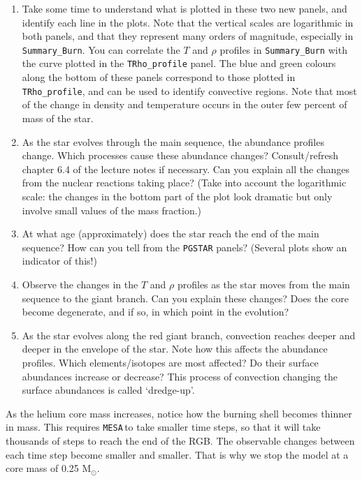 \documentclass[11pt,a4paper]{article}
\newcommand{\MESA}{\texttt{MESA}\,}
\begin{document}
\begin{enumerate}
\begin{enumerate}
\item Take some time to understand what is plotted in these two new panels, and identify each line in the plots. Note that the vertical scales are logarithmic in both panels, and that they represent many orders of magnitude, especially in \verb|Summary_Burn|. You can correlate the $T$ and $\rho$ profiles in \verb|Summary_Burn| with the curve plotted in the \verb|TRho_profile| panel.  The blue and green colours along the bottom of these panels correspond to those plotted in \verb|TRho_profile|, and can be used to identify convective regions. Note that most of the change in density and temperature occurs in the outer few percent of mass of the star.

\item As the star evolves through the main sequence, the abundance profiles change. Which processes cause these abundance changes? Consult/refresh chapter 6.4 of the lecture notes if necessary. Can you explain all the changes from the nuclear reactions taking place? (Take into account the logarithmic scale: the changes in the bottom part of the plot look dramatic but only involve small values of the mass fraction.)

\item At what age (approximately) does the star reach the end of the main sequence? How can you tell from the \texttt{PGSTAR} panels? (Several plots show an indicator of this!)
\item Observe the changes in the $T$ and $\rho$ profiles as the star moves from the main sequence to the giant branch. Can you explain these changes? Does the core become degenerate, and if so, in which point in the evolution? 

\item As the star evolves along the red giant branch, convection reaches deeper and deeper in the envelope of the star. Note how this affects the abundance profiles. Which elements/isotopes are most affected? Do their surface abundances increase or decrease? This process of convection changing the surface abundances is called `dredge-up'.
\end{enumerate}
As the helium core mass increases, notice how the burning shell becomes thinner in mass. This requires \MESA to take smaller time steps, so that it will take thousands of steps to reach the end of the RGB. The observable changes between each time step become smaller and smaller. That is why we stop the model at a core mass of 0.25 M$_\odot$.

\end{enumerate}
\end{document}
